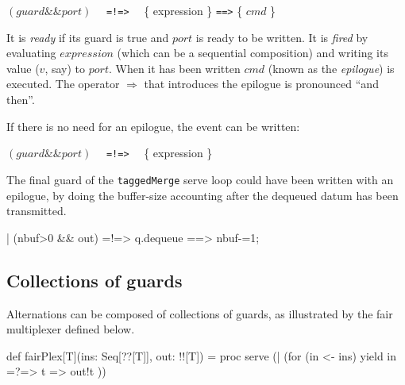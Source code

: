 \documentclass[12pt]{IOS-Book-Article-CPA-2017}
\def\AND{\mathtt{\&\&}}
\begin{document}
\begin{center}
\((guard \AND port)\) ~~\verb/=!=>/~~ \{ expression \} \verb/==>/ \{ \(cmd\) \} 
\end{center}


It is \textit{ready} if its guard is true and $port$ is ready to be written.
It is \textit{fired} by evaluating $expression$ (which can be a sequential composition) 
and writing its value ($v$, say) to $port$.  
When it has been written $cmd$ (known as the \textit{epilogue}) is executed.\note
{The operator $\Longrightarrow$ that introduces the {epilogue} is pronounced ``and then''.}

If there is no need for an epilogue, the event can be written:
\begin{center}
\((guard \AND port)\) ~~\verb/=!=>/~~ \{ expression \}
\end{center}
The final guard of the \verb/taggedMerge/ serve loop could have been written with an epilogue, by
doing the buffer-size accounting after the dequeued datum has been transmitted.
\begin{code+}[...]{}
          | (nbuf>0  && out) =!=> { q.dequeue } ==> { nbuf-=1; }
\end{code+}

\subsection{Collections of guards}
Alternations can
be composed of collections of guards, as illustrated 
by the fair multiplexer defined below.
\begin{code*}[fairPlex.scala]
import ox.CSO._
object fairPlex
{
\end{code*}
\label{scalafairplex}
\begin{code+}{}
  def fairPlex[T](ins: Seq[??[T]], out: !![T]) = 
      proc { serve (| (for (in <- ins) yield in =?=> { t => out!t })) }
\end{code+}
\begin{code*}[]
}
\end{code*}
\end{document}
